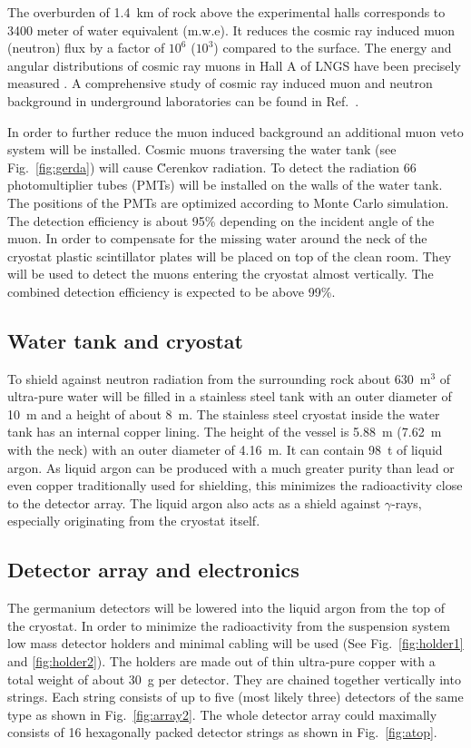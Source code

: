 The overburden of 1.4~km of rock above the experimental halls
corresponds to 3400 meter of water equivalent (m.w.e). It reduces the
cosmic ray induced muon (neutron) flux by a factor of $10^{6}$
($10^{3}$) compared to the surface. The energy and angular
distributions of cosmic ray muons in Hall A of LNGS have been
precisely measured \cite{Amb95, Lip91, Amb03}. A comprehensive study
of cosmic ray induced muon and neutron background in underground
laboratories can be found in Ref.~\cite{Mei06}.

In order to further reduce the muon induced background an additional
muon veto system will be installed. Cosmic muons traversing the water
tank (see Fig.~\ref{fig:gerda}) will cause \u{C}erenkov radiation. To
detect the radiation 66 photomultiplier tubes (PMTs) will be installed
on the walls of the water tank. The positions of the PMTs are
optimized according to Monte Carlo simulation. The detection
efficiency is about 95\% depending on the incident angle of the
muon. In order to compensate for the missing water around the neck of
the cryostat plastic scintillator plates will be placed on top of the
clean room. They will be used to detect the muons entering the
cryostat almost vertically. The combined detection efficiency is
expected to be above 99\%.

\subsection{Water tank and cryostat}
\label{sec:gerda:rock}
To shield against neutron radiation from the surrounding rock about
630~m$^{3}$ of ultra-pure water will be filled in a stainless steel
tank with an outer diameter of 10~m and a height of about 8~m. The
stainless steel cryostat inside the water tank has an internal copper
lining. The height of the vessel is 5.88~m (7.62~m with the neck) with
an outer diameter of 4.16~m. It can contain 98~t of liquid argon. As
liquid argon can be produced with a much greater purity than lead or
even copper traditionally used for shielding, this minimizes the
radioactivity close to the detector array. The liquid argon also acts
as a shield against $\gamma$-rays, especially originating from the
cryostat itself.

\subsection{Detector array and electronics}
\label{sec:gerda:cable}
The germanium detectors will be lowered into the liquid argon from the
top of the cryostat. In order to minimize the radioactivity from the
suspension system low mass detector holders and minimal cabling will
be used (See Fig.~\ref{fig:holder1} and \ref{fig:holder2}). The
holders are made out of thin ultra-pure copper with a total weight of
about 30~g per detector. They are chained together vertically into
strings. Each string consists of up to five (most likely three)
detectors of the same type as shown in Fig.~\ref{fig:array2}. The
whole detector array could maximally consists of 16 hexagonally packed
detector strings as shown in Fig.~\ref{fig:atop}.

